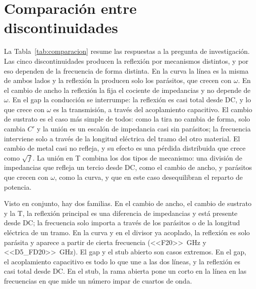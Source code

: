 \documentclass[11pt,letterpaper]{article}
\begin{document}
\section{Comparación entre discontinuidades}
\label{sec:comparacion}
La Tabla~\ref{tab:comparacion} resume las respuestas a la pregunta de investigación. Las cinco discontinuidades producen la reflexión por mecanismos distintos, y por eso dependen de la frecuencia de forma distinta. En la curva la línea es la misma de ambos lados y la reflexión la producen solo los parásitos, que crecen con $\omega$. En el cambio de ancho la reflexión la fija el cociente de impedancias y no depende de $\omega$. En el gap la conducción se interrumpe: la reflexión es casi total desde DC, y lo que crece con $\omega$ es la transmisión, a través del acoplamiento capacitivo. El cambio de sustrato es el caso más simple de todos: como la tira no cambia de forma, solo cambia $C'$ y la unión es un escalón de impedancia casi sin parásitos; la frecuencia interviene solo a través de la longitud eléctrica del tramo del otro material. El cambio de metal casi no refleja, y su efecto es una pérdida distribuida que crece como $\sqrt{f}$. La unión en T combina los dos tipos de mecanismo: una división de impedancias que refleja un tercio desde DC, como el cambio de ancho, y parásitos que crecen con $\omega$, como la curva, y que en este caso desequilibran el reparto de potencia.

Visto en conjunto, hay dos familias. En el cambio de ancho, el cambio de sustrato y la T, la reflexión principal es una diferencia de impedancias y está presente desde DC; la frecuencia solo importa a través de los parásitos o de la longitud eléctrica de un tramo. En la curva y en el divisor ya acoplado, la reflexión es solo parásita y aparece a partir de cierta frecuencia (\SI{<<F20>>}{GHz} y \SI{<<D5_FD20>>}{GHz}). El gap y el stub abierto son casos extremos. En el gap, el acoplamiento capacitivo es todo lo que une a las dos líneas, y la reflexión es casi total desde DC. En el stub, la rama abierta pone un corto en la línea en las frecuencias en que mide un número impar de cuartos de onda.
\end{document}
